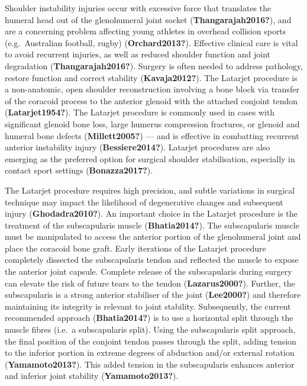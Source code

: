 \documentclass[]{elsarticle} %
\begin{document}
Shoulder instability injuries occur with excessive force that translates
the humeral head out of the glenohumeral joint socket
(\textbf{Thangarajah2016?}), and are a concerning problem affecting
young athletes in overhead collision sports (e.g.~Australian football,
rugby) (\textbf{Orchard2013?}). Effective clinical care is vital to
avoid recurrent injuries, as well as reduced shoulder function and joint
degradation (\textbf{Thangarajah2016?}). Surgery is often needed to
address pathology, restore function and correct stability
(\textbf{Kavaja2012?}). The Latarjet procedure is a non-anatomic, open
shoulder reconstruction involving a bone block via transfer of the
coracoid process to the anterior glenoid with the attached conjoint
tendon (\textbf{Latarjet1954?}). The Latarjet procedure is commonly used
in cases with significant glenoid bone loss, large humerus compression
fractures, or glenoid and humeral bone defects (\textbf{Millett2005?})
--- and is effective in combatting recurrent anterior instability injury
(\textbf{Bessiere2014?}). Latarjet procedures are also emerging as the
preferred option for surgical shoulder stabilisation, especially in
contact sport settings (\textbf{Bonazza2017?}).

The Latarjet procedure requires high precision, and subtle variations in
surgical technique may impact the likelihood of degenerative changes and
subsequent injury (\textbf{Ghodadra2010?}). An important choice in the
Latarjet procedure is the treatment of the subscapularis muscle
(\textbf{Bhatia2014?}). The subscapularis muscle must be manipulated to
access the anterior portion of the glenohumeral joint and place the
coracoid bone graft. Early iterations of the Latarjet procedure
completely dissected the subscapularis tendon and reflected the muscle
to expose the anterior joint capsule. Complete release of the
subscapularis during surgery can elevate the risk of future tears to the
tendon (\textbf{Lazarus2000?}). Further, the subscapularis is a strong
anterior stabiliser of the joint (\textbf{Lee2000?}) and therefore
maintaining its integrity is relevant to joint stability. Subsequently,
the current recommended approach (\textbf{Bhatia2014?}) is to use a
horizontal split through the muscle fibres (i.e.~a subscapularis split).
Using the subscapularis split approach, the final position of the
conjoint tendon passes through the split, adding tension to the inferior
portion in extreme degrees of abduction and/or external rotation
(\textbf{Yamamoto2013?}). This added tension in the subscapularis
enhances anterior and inferior joint stability (\textbf{Yamamoto2013?}).
\end{document}
